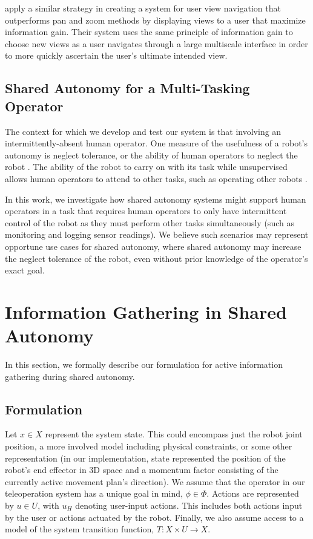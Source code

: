\documentclass[conference]{IEEEtran}
\begin{document}
\citet{liu2017bignav} apply a similar strategy in creating a system for user view navigation that outperforms pan and zoom methods by displaying views to a user that maximize information gain. Their system uses the same principle of information gain to choose new views as a user navigates through a large multiscale interface in order to more quickly ascertain the user's ultimate intended view.

\subsection{Shared Autonomy for a Multi-Tasking Operator}
The context for which we develop and test our system is that involving an intermittently-absent human operator. One measure of the usefulness of a robot's autonomy is neglect tolerance, or the ability of human operators to neglect the robot \cite{crandall2002characterizing, olsen2003metrics}. The ability of the robot to carry on with its task while unsupervised allows human operators to attend to other tasks, such as operating other robots \cite{crandall2005validating, cummings2008predicting}.

In this work, we investigate how shared autonomy systems might support human operators in a task that requires human operators to only have intermittent control of the robot as they must perform other tasks simultaneously (such as monitoring and logging sensor readings). We believe such scenarios may represent opportune use cases for shared autonomy, where shared autonomy may increase the neglect tolerance of the robot, even without prior knowledge of the operator's exact goal.

\section{Information Gathering in Shared Autonomy}

In this section, we formally describe our formulation for active information gathering during shared autonomy.

\subsection{Formulation}

Let $ x \in X $ represent the system state. This could encompass just the robot joint position, a more involved model including physical constraints, or some other representation (in our implementation, state represented the position of the robot's end effector in 3D space and a momentum factor consisting of the currently active movement plan's direction). We assume that the operator in our teleoperation system has a unique goal in mind, $\phi \in \Phi$. Actions are represented by $ u \in U $, with $u_H$ denoting user-input actions. This includes both actions input by the user or actions actuated by the robot. Finally, we also assume access to a model of the system transition function, $T: X \times U \rightarrow X$.
\end{document}

